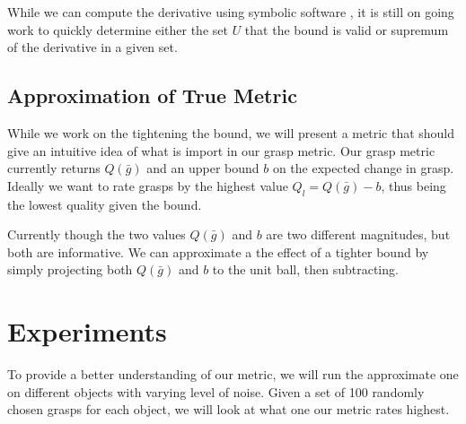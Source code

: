 \documentclass[letterpaper, 10 pt, conference]{ieeeconf}  %
\begin{document}
While we can compute the derivative using symbolic software \cite{SymPy}, it is still on going work to quickly determine either the set $U$ that the bound is valid or supremum of the derivative in a given set.    

\subsection{Approximation of True Metric}
While we work on the tightening the bound, we will present a metric that should give an intuitive idea of what is import in our grasp metric. Our grasp metric currently returns $Q(\bar{g})$ and an upper bound $b$ on the expected change in grasp. Ideally we want to rate grasps by the highest value $Q_l = Q(\bar{g}) - b$, thus being the lowest quality given the bound. 

Currently though the two values $Q(\bar{g})$ and $b$ are two different magnitudes, but both are informative. We can approximate a the effect of a tighter bound by simply projecting both $Q(\bar{g})$ and $b$ to the unit ball, then subtracting. 

\section{Experiments}

To provide a better understanding of our metric, we will run the approximate one on different objects with varying level of noise. Given a set of 100 randomly chosen grasps for each object, we will look at what one our metric rates highest. 





\end{document}
